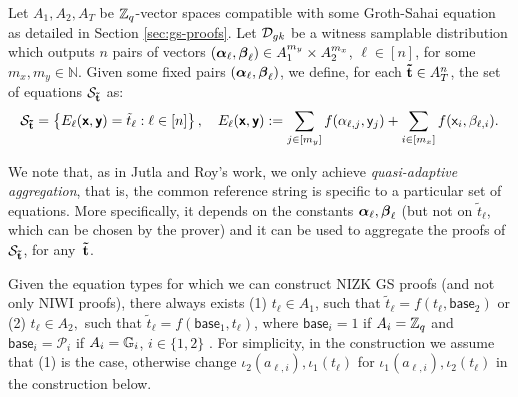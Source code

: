 Let $A_1,A_2,A_T$ be $\mathbb{Z}_q$-vector spaces compatible with some 
Groth-Sahai equation as detailed in Section
\ref{sec:gs-proofs}.  Let $\mathcal{D}_{{gk}}$ be a witness samplable distribution which outputs $n$ pairs of vectors
$({\boldsymbol \alpha}_\ell, {\boldsymbol \beta}_\ell) \in A_1^{m_y} \times A_2^{m_x}$, $\ell \in [n]$, for some 
$m_x,m_y \in \mathbb{N}$. Given some fixed pairs $({\boldsymbol \alpha}_\ell,
{\boldsymbol \beta}_\ell)$, we define, for each $\mathbf{\tilde{t}} \in A_{T}^{n}$, the set of equations $\mathcal{S}_{\mathbf{\tilde{t}}}$ as:
$$\mathcal{S}_{\mathbf{\tilde{t}}}=\left\{ E_{\ell}(\textbf{\textsf{x}},\textbf{\textsf{y}})=\tilde{t}_{\ell}: \ell \in [n]\right\},  \quad 
E_{\ell}(\textbf{\textsf{x}},\textbf{\textsf{y}}):=\sum_{j\in[m_y]} f(\alpha_{\ell,j}, \mathsf{y}_j) + 
\sum_{i\in[m_x]}  f(\mathsf{x}_i, \beta_{\ell,i}).$$  

We note that, as in Jutla and Roy's work, we only achieve \textit{quasi-adaptive aggregation}, that is, the common reference string is specific to a particular set of equations. More specifically, it depends on the constants ${\boldsymbol \alpha}_{\ell},{\boldsymbol \beta}_{\ell}$ (but not on $\tilde{t}_{\ell}$, which can be chosen by the prover) and it can be used to aggregate the proofs of 
$\mathcal{S}_{\mathbf{\tilde{t}}}$, for any~$\mathbf{\tilde{t}}$.  

Given the equation types for which we can construct NIZK GS proofs (and not only NIWI proofs), there always exists (1) $t_{\ell} \in A_1$, such that $\tilde{t}_{\ell}=f(t_{\ell},\mathsf{base}_{2})$ or 
 (2) ${t}_{\ell} \in A_2,$ such that $\tilde{t}_{\ell}=f(\mathsf{base}_{1},t_{\ell})$, where $\mathsf{base}_{i}=1$ if $A_i=\mathbb{Z}_q$ and $\mathsf{base}_i=\mathcal{P}_i$ if $A_i=\mathbb{G}_i$, $i \in \{1,2\}$ \cite{SIAMJC:GroSah12}. For simplicity, 
 in the construction we assume that (1) is the case, otherwise 
 change $\iota_2(a_{\ell,i}),  \iota_1(t_{\ell})$ for $\iota_1(a_{\ell,i}),  \iota_2(t_{\ell})$ in the construction below. 

